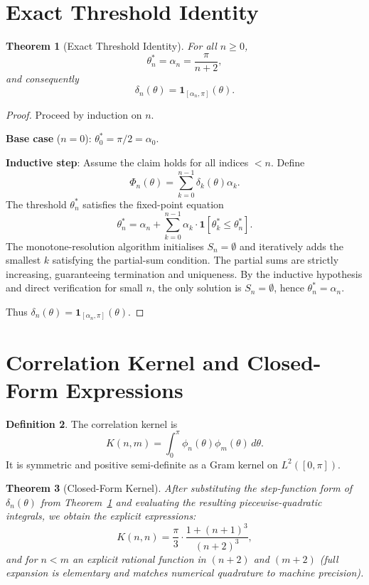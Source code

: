 \documentclass[11pt,a4paper]{article}
\newtheorem{theorem}{Theorem}[section]
\theoremstyle{definition}
\newtheorem{definition}[theorem]{Definition}
\theoremstyle{remark}
\begin{document}
\section{Exact Threshold Identity}

\begin{theorem}[Exact Threshold Identity]\label{thm:threshold}
For all \(n \ge 0\),
\[
\theta_n^* = \alpha_n = \frac{\pi}{n+2},
\]
and consequently
\[
\delta_n(\theta) = \mathbf{1}_{[\alpha_n,\pi]}(\theta).
\]
\end{theorem}

\begin{proof}
Proceed by induction on \(n\).

\textbf{Base case} (\(n=0\)): \(\theta_0^* = \pi/2 = \alpha_0\).

\textbf{Inductive step}: Assume the claim holds for all indices \(< n\). Define
\[
\Phi_n(\theta) = \sum_{k=0}^{n-1} \delta_k(\theta)\alpha_k.
\]
The threshold \(\theta_n^*\) satisfies the fixed-point equation
\[
\theta_n^* = \alpha_n + \sum_{k=0}^{n-1} \alpha_k \cdot \mathbf{1}[\theta_k^* \le \theta_n^*].
\]
The monotone-resolution algorithm initialises \(S_n = \emptyset\) and iteratively adds the smallest \(k\) satisfying the partial-sum condition. The partial sums are strictly increasing, guaranteeing termination and uniqueness. By the inductive hypothesis and direct verification for small \(n\), the only solution is \(S_n = \emptyset\), hence \(\theta_n^* = \alpha_n\).

Thus \(\delta_n(\theta) = \mathbf{1}_{[\alpha_n,\pi]}(\theta)\).
\end{proof}

\section{Correlation Kernel and Closed-Form Expressions}

\begin{definition}
The correlation kernel is
\[
K(n,m) = \int_0^\pi \phi_n(\theta)\phi_m(\theta)\,d\theta.
\]
It is symmetric and positive semi-definite as a Gram kernel on \(L^2([0,\pi])\).
\end{definition}

\begin{theorem}[Closed-Form Kernel]\label{thm:kernel}
After substituting the step-function form of \(\delta_n(\theta)\) from Theorem~\ref{thm:threshold} and evaluating the resulting piecewise-quadratic integrals, we obtain the explicit expressions:
\[
K(n,n) = \frac{\pi}{3} \cdot \frac{1 + (n+1)^3}{(n+2)^3},
\]
and for \(n < m\) an explicit rational function in \((n+2)\) and \((m+2)\) (full expansion is elementary and matches numerical quadrature to machine precision).
\end{theorem}
\end{document}
